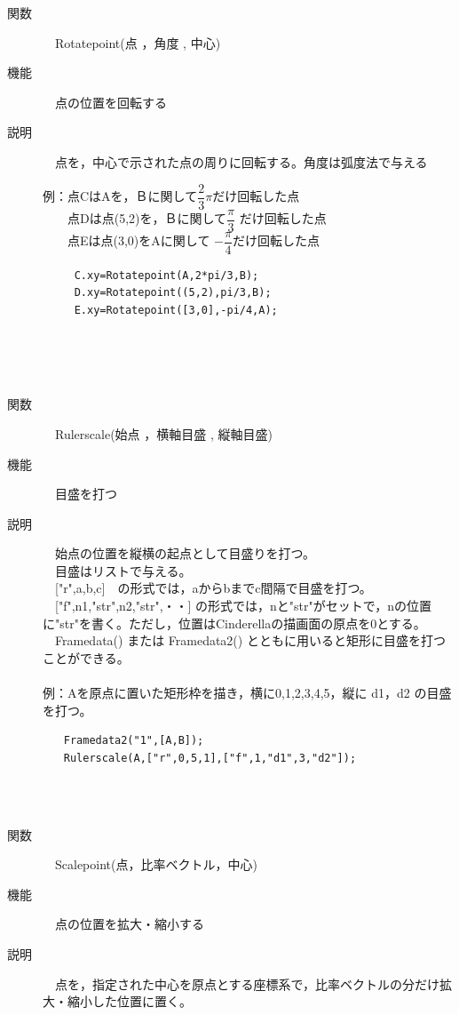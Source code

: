 \documentclass[papersize,a4paper,12pt,uplatex]{jsarticle}
\begin{document}
\begin{description}
\hypertarget{rotatepoint}{}
\item[関数]　Rotatepoint(点 ，角度 , 中心)
\item[機能]　点の位置を回転する
\item[説明]　点を，中心で示された点の周りに回転する。角度は弧度法で与える\\
\begin{spacing}{1.5}
例：点CはAを，Ｂに関して$\dfrac{2}{3}\pi $だけ回転した点\\
　　点Dは点(5,2)を，Ｂに関して$\dfrac{\pi}{3}$ だけ回転した点\\
　　点Eは点(3,0)をAに関して $-\dfrac{\pi}{4} $だけ回転した点
\end{spacing}
\begin{verbatim}
　　　C.xy=Rotatepoint(A,2*pi/3,B);
　　　D.xy=Rotatepoint((5,2),pi/3,B);
　　　E.xy=Rotatepoint([3,0],-pi/4,A);
\end{verbatim}
　\\
　　　\\
　\\

\hypertarget{rulerscale}{}
\item[関数]　Rulerscale(始点 ，横軸目盛 , 縦軸目盛)
\item[機能]　目盛を打つ
\item[説明]　始点の位置を縦横の起点として目盛りを打つ。\\
　目盛はリストで与える。\\
　["r",a,b,c]　の形式では，aからbまでc間隔で目盛を打つ。\\
　["f",n1,"str",n2,"str",・・] の形式では，nと"str"がセットで，nの位置に"str"を書く。ただし，位置はCinderellaの描画面の原点を0とする。\\
　Framedata() または Framedata2() とともに用いると矩形に目盛を打つことができる。\\
　\\
例：Aを原点に置いた矩形枠を描き，横に0,1,2,3,4,5，縦に d1，d2 の目盛を打つ。
\begin{verbatim}
　　Framedata2("1",[A,B]);
　　Rulerscale(A,["r",0,5,1],["f",1,"d1",3,"d2"]);
\end{verbatim}　
　　　\\
　\\

\hypertarget{scalepoint}{}
\item[関数]　Scalepoint(点，比率ベクトル，中心)
\item[機能]　点の位置を拡大・縮小する
\item[説明]　点を，指定された中心を原点とする座標系で，比率ベクトルの分だけ拡大・縮小した位置に置く。\\


\end{description}
\end{document}
